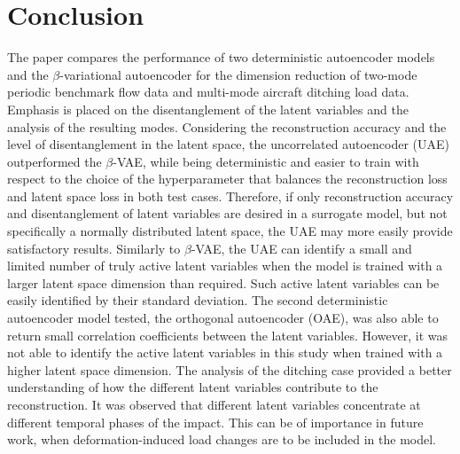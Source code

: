 \section{Conclusion}
\label{sec:4}
The paper compares the performance of two deterministic autoencoder models and the $\beta$-variational autoencoder 
for the dimension reduction of two-mode periodic benchmark flow data and multi-mode aircraft ditching load data.  Emphasis is placed on the disentanglement of the latent variables and the analysis of the resulting modes. Considering the reconstruction accuracy and the level of disentanglement in the latent space, the uncorrelated autoencoder (UAE) outperformed the $\beta$-VAE, while being deterministic and easier to train with respect to the choice of the hyperparameter that balances the reconstruction loss and latent space loss in both test cases.
Therefore, if only reconstruction accuracy and disentanglement of latent variables are desired in a surrogate model, but not specifically a normally distributed latent space, the UAE may more easily provide satisfactory results.
%
Similarly to $\beta$-VAE, the UAE can identify a small and limited number of truly active latent variables when the model is trained with a larger latent space dimension than required. Such active latent variables can be easily identified by their standard deviation. 
%
The second deterministic autoencoder model tested, the orthogonal autoencoder (OAE), was also able to return small correlation coefficients between the latent variables. However, it was not able to identify the active latent variables in this study when trained with a higher latent space dimension.
%
The analysis of the ditching case provided a better understanding of how the different latent variables contribute to the reconstruction. It was observed that different latent variables concentrate at different temporal phases of the impact. This can be of importance in future work, when deformation-induced load changes are to be included in the model.